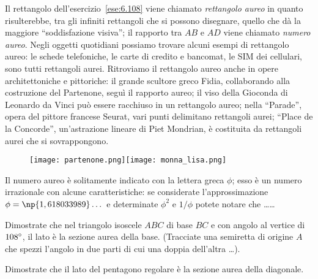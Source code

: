 Il rettangolo dell'esercizio~\ref{ese:6.108} viene chiamato \emph{rettangolo aureo} in quanto risulterebbe, tra gli infiniti rettangoli che si possono disegnare, quello che dà la maggiore ``soddisfazione visiva''; il rapporto tra $AB$ e $AD$ viene chiamato \emph{numero aureo}. 
Negli oggetti quotidiani possiamo trovare alcuni esempi di rettangolo aureo: le schede telefoniche, le carte di credito e bancomat, le SIM dei cellulari, sono tutti rettangoli aurei.
Ritroviamo il rettangolo aureo anche in opere architettoniche e pittoriche: il grande scultore greco Fidia, collaborando alla costruzione del Partenone, seguì il rapporto aureo; il viso della Gioconda di Leonardo da Vinci può essere racchiuso in un rettangolo aureo; nella ``Parade'', opera del pittore francese Seurat, vari punti delimitano rettangoli aurei; ``Place de la Concorde'', un'astrazione lineare di Piet Mondrian, è costituita da rettangoli aurei che si sovrappongono.

\begin{figure*}[!htb]
	\centering\texttt{[image: partenone.png]}\qquad\texttt{[image: monna\_lisa.png]}
\end{figure*}

\begin{esercizio}
\label{ese:6.109}
Il numero aureo è solitamente indicato con la lettera greca $\phi$; esso è un numero irrazionale con alcune caratteristiche: se considerate l'approssimazione $\phi=\np{1,618033989}\ldots{}$ e determinate $\phi^2$ e $1/\phi$ potete notare che \ldots\ldots{}
\end{esercizio}

\begin{esercizio}
\label{ese:6.110}
Dimostrate che nel triangolo isoscele $ABC$ di base $BC$ e con angolo al vertice di $108{}^{\circ}$, il lato è la sezione aurea della base. (Tracciate una semiretta di origine $A$ che spezzi l'angolo in due parti di cui una doppia dell'altra \ldots{}).
\end{esercizio}

\begin{esercizio}
\label{ese:6.111}
Dimostrate che il lato del pentagono regolare è la sezione aurea della diagonale.
\end{esercizio}

